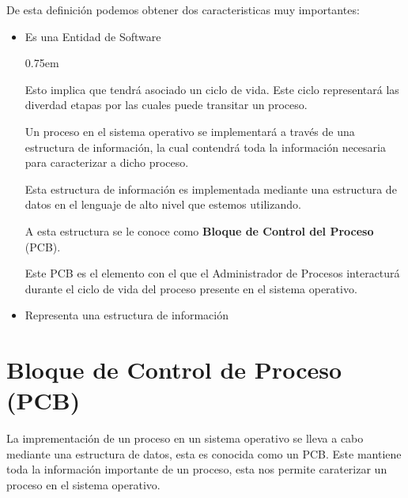 \documentclass[12pt, fleqn]{report}                             %
\newenvironment{SmallIndentation}[1][0.75em]                    %
    {\begin{adjustwidth}{#1}{}\begin{footnotesize}}                 %
    {\end{footnotesize}\end{adjustwidth}}                           %
\begin{document}
            De esta definición podemos obtener dos caracteristicas muy importantes:
            \begin{itemize}
                
                \item Es una Entidad de Software

                    \begin{SmallIndentation}
                        Esto implica que tendrá asociado un ciclo de vida. Este ciclo representará
                        las diverdad etapas por las cuales puede transitar un proceso.

                        Un proceso en el sistema operativo se implementará a través de una
                        estructura de información, la cual contendrá toda la información necesaria
                        para caracterizar a dicho proceso.

                        Esta estructura de información es implementada mediante una
                        estructura de datos en el lenguaje de alto nivel que estemos utilizando.

                        A esta estructura se le conoce como \textbf{Bloque de Control del Proceso}
                        (PCB). 

                        Este PCB es el elemento con el que el Administrador de Procesos
                        interacturá durante el ciclo de vida del proceso presente en el sistema 
                        operativo.
                    \end{SmallIndentation}

                \item Representa una estructura de información
            \end{itemize}



        \clearpage
        \section{Bloque de Control de Proceso (PCB)}

            La imprementación de un proceso en un sistema operativo se lleva a cabo mediante
            una estructura de datos, esta es conocida como un PCB.
            Este mantiene toda la información importante de un proceso, esta nos permite 
            caraterizar un proceso en el sistema operativo.
\end{document}
